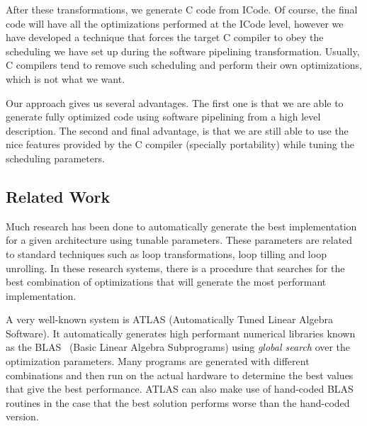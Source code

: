 \documentclass[10pt]{article}
\begin{document}
After these transformations, we generate C code from ICode. Of course, the final code will
have all the optimizations performed at the ICode level, however we have developed a technique that
forces the target C compiler to obey the scheduling we have set up during the software pipelining
transformation. Usually, C compilers tend to remove such scheduling and perform their own optimizations,
which is not what we want.

Our approach gives us several advantages. The first one is that we are able to generate fully optimized
code using software pipelining from a high level description. The second and final advantage, is that
we are still able to use the nice features provided by the C compiler (specially portability)
while tuning the scheduling parameters. 


\begin{comment}
+( ) Work directly in the SPIRAL intermediate code. Any optimization that is done
  here can benefit any operation expressed at a higher level of abstraction.

+( ) We use Software Pipelining in addition to loop unrolling and other
  optimizations that we can fine tune.

+( ) We generate the target code in C and use a quality production compiler.

+( ) But we instrument our code in such a way that we can force a particular
  schedule on our code.

+( ) Thus we get all of the benefits of APGS and the ability to even tune
  schedules, but we can still take advantage of the compiler for dealing with
  mapping our implementation to assembly (reg alloc and such).
\end{comment}

\subsection{Related Work}

Much research has been done to automatically generate the best implementation
for a given architecture using tunable parameters. These parameters are
related to standard techniques such as loop transformations, loop tilling and loop unrolling.
In these research systems, there is a procedure that searches for the best combination of optimizations
that will generate the most performant implementation.

A very well-known system is ATLAS \cite{Whaley00automatedempirical} (Automatically Tuned Linear Algebra Software).
It automatically generates high performant numerical libraries known as the BLAS~\cite{Lawson:79} (Basic Linear Algebra Subprograms)
using \emph{global search} over the optimization parameters. Many programs are generated with different combinations
and then run on the actual hardware to determine the best values that give the best performance.
ATLAS can also make use of hand-coded BLAS routines in the case that the best solution performs worse than the hand-coded version.
\end{document}
